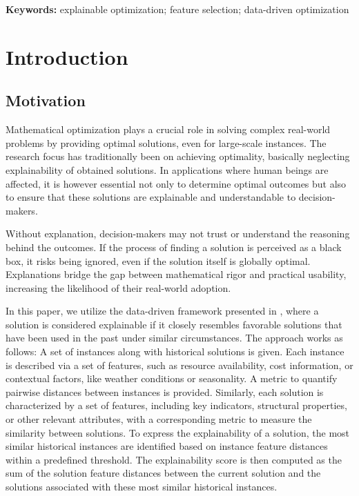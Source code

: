 \documentclass[11pt, a4paper]{article}
\newcommand{\FRil}[1]{\todo[color=black, textcolor=white, inline, author=FR]{#1}}
\begin{document}
\medskip
\noindent \textbf{Keywords:} explainable optimization; feature selection; data-driven optimization


\section{Introduction}

\subsection{Motivation}

Mathematical optimization plays a crucial role in solving complex
real-world problems by providing optimal solutions, even
for large-scale instances. The research focus has traditionally been
on achieving optimality, basically neglecting explainability of
obtained solutions. In applications where human beings are affected, it is however essential not only to determine
optimal outcomes but also to ensure that these solutions are
explainable and understandable to decision-makers.

Without explanation, decision-makers may not
trust or understand the reasoning behind the outcomes. If the process of finding a solution is perceived as a black box, it risks being ignored, even if the solution itself is globally optimal. Explanations bridge the gap between mathematical rigor and practical usability, increasing the likelihood of their real-world adoption.

In this paper, we utilize the data-driven framework presented in \cite{aigner2024framework}, where a solution is considered
explainable if it closely resembles favorable solutions that have been used in the past under similar circumstances. 
The approach works as follows:
A set of instances along with historical solutions is given. Each instance is described via a set of features, such as resource availability, cost information, or contextual factors, like weather conditions or seasonality. A metric to quantify pairwise distances between instances is provided. Similarly, each solution is characterized by a set of features, including key indicators, structural properties, or other relevant attributes, with a corresponding metric to measure the similarity between solutions. To express the explainability of a solution, the most similar historical instances are identified based on instance feature distances within a predefined threshold. The explainability score is then computed as the sum of the solution feature distances between the current solution and the solutions associated with these most similar historical instances.
\end{document}
